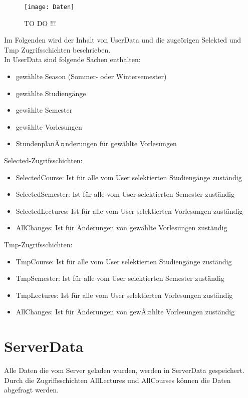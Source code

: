 \begin{figure}[htb]
    \centering
    \texttt{[image: Daten]}
    \caption{TO DO !!!}
\end{figure}

Im Folgenden wird der Inhalt von UserData und die zugeörigen Selekted und Tmp Zugrifsschichten beschrieben.\\

In UserData sind folgende Sachen enthalten:
\begin{itemize}
     \item gewählte Season (Sommer- oder Wintersemester)
     \item gewählte Studiengänge
     \item gewählte Semester
     \item gewählte Vorlesungen
     \item StundenplanÃ¤nderungen für gewählte Vorlesungen\\     
\end{itemize}

Selected-Zugrifsschichten: 
\begin{itemize}
     \item SelectedCourse: Ist für alle vom User selektierten Studiengänge zuständig
     \item SelectedSemester: Ist für alle vom User selektierten Semester zuständig
     \item SelectedLectures: Ist für alle vom User selektierten Vorlesungen zuständig
     \item AllChanges: Ist für Änderungen von gewählte Vorlesungen zuständig \\
\end{itemize}

Tmp-Zugrifsschichten: 
\begin{itemize}
     \item TmpCourse: Ist für alle vom User selektierten Studiengänge zuständig
     \item TmpSemester: Ist für alle vom User selektierten Semester zuständig
     \item TmpLectures: Ist für alle vom User selektierten Vorlesungen zuständig
     \item AllChanges: Ist für Änderungen von gewÃ¤hlte Vorlesungen zuständig 
\end{itemize}

\newpage
\section{ServerData}
Alle Daten die vom Server geladen wurden, werden in ServerData gespeichert. Durch die Zugriffsschichten AllLectures und AllCourses können die Daten abgefragt werden.

